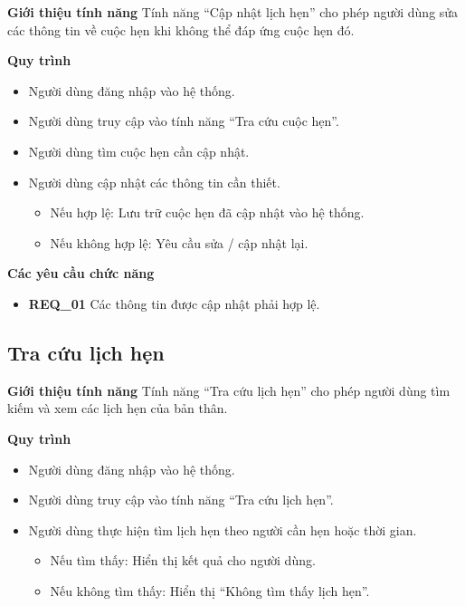 \noindent \textbf{Giới thiệu tính năng}
Tính năng ``Cập nhật lịch hẹn'' cho phép người dùng sửa các thông tin về cuộc hẹn khi không thể đáp ứng cuộc hẹn đó.

\noindent \textbf{Quy trình}
\begin{itemize}
    \item Người dùng đăng nhập vào hệ thống.
    \item Người dùng truy cập vào tính năng ``Tra cứu cuộc hẹn''.
    \item Người dùng tìm cuộc hẹn cần cập nhật.
    \item Người dùng cập nhật các thông tin cần thiết.
    \begin{itemize}
        \item Nếu hợp lệ: Lưu trữ cuộc hẹn đã cập nhật vào hệ thống.
        \item Nếu không hợp lệ: Yêu cầu sửa / cập nhật lại.
    \end{itemize}
\end{itemize}

\noindent \textbf{Các yêu cầu chức năng}
\begin{itemize}
    \item \textbf{REQ\_01} Các thông tin được cập nhật phải hợp lệ.
\end{itemize}

\subsection{Tra cứu lịch hẹn}

\noindent \textbf{Giới thiệu tính năng}
Tính năng ``Tra cứu lịch hẹn'' cho phép người dùng tìm kiếm và xem các lịch hẹn của bản thân.

\noindent \textbf{Quy trình}
\begin{itemize}
    \item Người dùng đăng nhập vào hệ thống.
    \item Người dùng truy cập vào tính năng ``Tra cứu lịch hẹn''.
    \item Người dùng thực hiện tìm lịch hẹn theo người cần hẹn hoặc thời gian.
    \begin{itemize}
        \item Nếu tìm thấy: Hiển thị kết quả cho người dùng.
        \item Nếu không tìm thấy: Hiển thị ``Không tìm thấy lịch hẹn''.
    \end{itemize}
\end{itemize}

